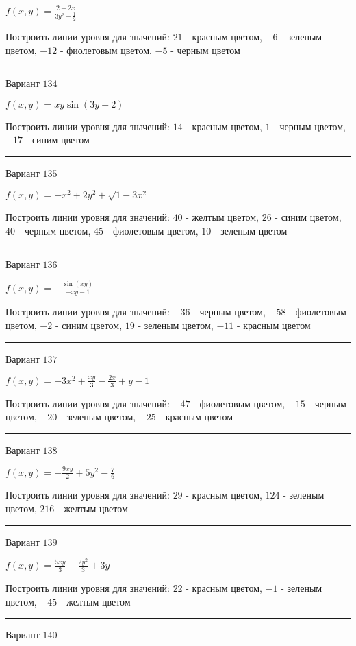 \documentclass[11pt]{report}
\begin{document}
$f(x, y) = \frac{2 - 2 x}{3 y^{2} + \frac{1}{2}}$

Построить линии уровня для значений: $21$ - красным цветом, $-6$ - зеленым цветом, $-12$ - фиолетовым цветом, $-5$ - черным цветом
\begin{center}
\noindent\rule{8cm}{0.4pt}
\end{center}
Вариант $134$


$f(x, y) = x y \sin{\left(3 y - 2 \right)}$

Построить линии уровня для значений: $14$ - красным цветом, $1$ - черным цветом, $-17$ - синим цветом
\begin{center}
\noindent\rule{8cm}{0.4pt}
\end{center}
Вариант $135$


$f(x, y) = - x^{2} + 2 y^{2} + \sqrt{1 - 3 x^{2}}$

Построить линии уровня для значений: $40$ - желтым цветом, $26$ - синим цветом, $40$ - черным цветом, $45$ - фиолетовым цветом, $10$ - зеленым цветом
\begin{center}
\noindent\rule{8cm}{0.4pt}
\end{center}
Вариант $136$


$f(x, y) = - \frac{\sin{\left(x y \right)}}{- x y - 1}$

Построить линии уровня для значений: $-36$ - черным цветом, $-58$ - фиолетовым цветом, $-2$ - синим цветом, $19$ - зеленым цветом, $-11$ - красным цветом
\begin{center}
\noindent\rule{8cm}{0.4pt}
\end{center}
Вариант $137$


$f(x, y) = - 3 x^{2} + \frac{x y}{3} - \frac{2 x}{3} + y - 1$

Построить линии уровня для значений: $-47$ - фиолетовым цветом, $-15$ - черным цветом, $-20$ - зеленым цветом, $-25$ - красным цветом
\begin{center}
\noindent\rule{8cm}{0.4pt}
\end{center}
Вариант $138$


$f(x, y) = - \frac{9 x y}{2} + 5 y^{2} - \frac{7}{6}$

Построить линии уровня для значений: $29$ - красным цветом, $124$ - зеленым цветом, $216$ - желтым цветом
\begin{center}
\noindent\rule{8cm}{0.4pt}
\end{center}
Вариант $139$


$f(x, y) = \frac{5 x y}{3} - \frac{2 y^{2}}{3} + 3 y$

Построить линии уровня для значений: $22$ - красным цветом, $-1$ - зеленым цветом, $-45$ - желтым цветом
\begin{center}
\noindent\rule{8cm}{0.4pt}
\end{center}
Вариант $140$
\end{document}
